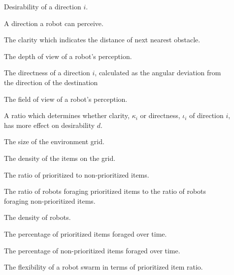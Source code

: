 \begin{description}
	\item[\parbox{\namewidth}{$d$}] Desirability of a direction $i$.
	\item[\parbox{\namewidth}{$i$}] A direction a robot can perceive.
	
	\item[\parbox{\namewidth}{$\kappa_i$}] The clarity which indicates the distance of next nearest obstacle.
	 
	\item[\parbox{\namewidth}{$v$}] The depth of view of a robot's perception.

	\item[\parbox{\namewidth}{$\iota_i$}] The directness of a direction $i$, calculated as the angular deviation from the direction of the destination

	\item[\parbox{\namewidth}{$f$}] The	field of view of a robot's perception.
		
	\item[\parbox{\namewidth}{$\lambda$}] A ratio which determines whether clarity, $\kappa_i$ or directness, $\iota_i$ of direction $i$, has more effect on desirability $d$.
	
	\item[\parbox{\namewidth}{$S$}] The	size of the environment grid.

	\item[\parbox{\namewidth}{$p$}] The density of the items on the grid.

	\item[\parbox{\namewidth}{$r$}] The ratio of prioritized to non-prioritized items.

	\item[\parbox{\namewidth}{$\tau$}] The ratio of robots foraging prioritized items to the ratio of robots foraging non-prioritized items.

	\item[\parbox{\namewidth}{$c$}] The density of robots.

	\item[\parbox{\namewidth}{$E_P$}] The percentage of prioritized items foraged over time.

	\item[\parbox{\namewidth}{$E_{NP}$}] The percentage of non-prioritized items foraged over time.

	\item[\parbox{\namewidth}{$F_r$}] The flexibility of a robot swarm in terms of prioritized item ratio.
	

\end{description}
